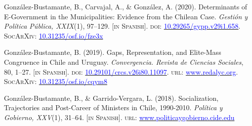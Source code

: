 \begin{publications}
\begin{benumerate}{9}
\item{\small González-Bustamante, B., Carvajal, A., \& Gonz\'alez, A. (2020). Determinants of E-Government in the Municipalities: Evidence from the Chilean Case. {\itshape Gesti\'on y Pol\'itica P\'ublica, XXIX}(1), 97--129. {\footnotesize \scshape [in Spanish]}. {\scshape doi:} \href{http://dx.doi.org/10.29265/gypp.v29i1.658}{\textcolor{blue}{10.29265/gypp.v29i1.658}}. {\scshape \footnotesize SocArXiv}: \href{https://doi.org/10.31235/osf.io/fze3x}{\textcolor{blue}{10.31235/osf.io/fze3x}}} \vspace{1mm}

\item{\small González-Bustamante, B. (2019). Gaps, Representation, and Elite-Mass Congruence in Chile and Uruguay. {\itshape Convergencia. Revista de Ciencias Sociales}, 80, 1--27. {\footnotesize \scshape [in Spanish]}. {\scshape doi}: \href{https://doi.org/10.29101/crcs.v26i80.11097}{\textcolor{blue}{10.29101/crcs.v26i80.11097}}. {\scshape url}:  \href{https://www.redalyc.org/jatsRepo/105/10559568002/index.html}{\textcolor{blue}{www.redalyc.org}}. {\scshape \footnotesize SocArXiv}: \href{https://doi.org/10.31235/osf.io/cqym8}{\textcolor{blue}{10.31235/osf.io/cqym8}}}\vspace{1mm}

\item{\small González-Bustamante, B., \& Garrido-Vergara, L. (2018). Socialization, Trajectories and Post-Career of Ministers in Chile, 1990-2010. {\itshape Pol\'itica y Gobierno, XXV}(1), 31--64. {\footnotesize \scshape [in Spanish]}. {\scshape url}: \href{http://www.politicaygobierno.cide.edu/index.php/pyg/article/view/1080}{\textcolor{blue}{www.politicaygobierno.cide.edu}}}\vspace{1mm}

\end{benumerate}

\end{publications}


